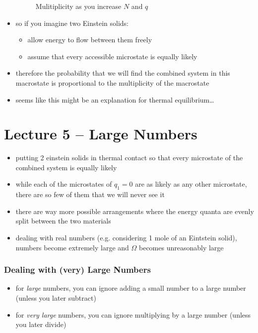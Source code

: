 \documentclass[10pt]{article}
\begin{document}
\begin{itemize}
\begin{figure}[h]
            \caption{Mulitiplicity as you increase $N$ and $q$}
            \label{fig:mulitiplicityMoreNq}
        \end{figure}
    \item so if you imagine two Einstein solids:
        \begin{itemize}
            \item allow energy to flow between them freely
            \item assume that every accessible microstate is equally likely
        \end{itemize}
    \item therefore the probability that we will find the combined system in this macrostate is proportional to the multiplicity of the macrostate
    \item seems like this might be an explanation for thermal equilibrium\ldots
\end{itemize}


\section{Lecture 5 -- Large Numbers}
\begin{itemize}
    \item putting 2 einstein solids in thermal contact so that every microstate of the combined system is equally likely
    \item while each of the microstates of $ q_1 = 0$ are as likely as any other microstate, there are so few of them that we will never see it
    \item there are way more possible arrangements where the energy quanta are evenly split between the two materials
    \item dealing with real numbers (e.g. considering 1 mole of an Eintstein solid), numbers become extremely large and $\Omega$ becomes unreasonably large
\end{itemize}

\subsubsection{Dealing with (very) Large Numbers}
\begin{itemize}
    \item for \textit{large} numbers, you can ignore adding a small number to a large number (unless you later subtract)
    \item for \textit{very large} numbers, you can ignore multiplying by a large number (unless you later divide)
\end{itemize}
\end{document}
